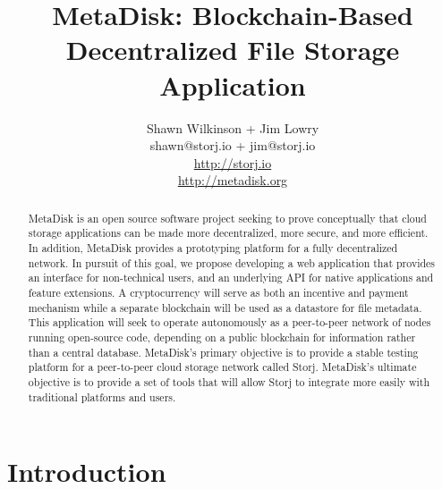 \documentclass[a4paper,10pt]{article}
\begin{document}
\lstset{basicstyle=\ttfamily\footnotesize,breaklines=true}
\lstset{numbers=left, numberstyle=\tiny, stepnumber=1, numbersep=5pt}
\lstset{language=TeX}


\title{\large \bf MetaDisk:  Blockchain-Based Decentralized File Storage Application}
\author{\small Shawn Wilkinson + Jim Lowry\\ \small shawn@storj.io + jim@storj.io \\  \small \url{http://storj.io} \\  \small \url{http://metadisk.org}}
\maketitle


\begin{abstract}
MetaDisk is an open source software project seeking to prove conceptually that cloud storage applications can be made more decentralized, more secure, and more efficient. In addition, MetaDisk provides a prototyping platform for a fully decentralized network. In pursuit of this goal, we propose developing a web application that provides an interface for non-technical users, and an underlying API for native applications and feature extensions. A cryptocurrency will serve as both an incentive and payment mechanism while a separate blockchain will be used as a datastore for file metadata. This application will seek to operate autonomously as a peer-to-peer network of nodes running open-source code, depending on a public blockchain for information rather than a central database. MetaDisk’s primary objective is to provide a stable testing platform for a peer-to-peer cloud storage network called Storj. MetaDisk’s ultimate objective is to provide a set of tools that will allow Storj to integrate more easily with traditional platforms and users. 
\end{abstract}
\section{Introduction}
\end{document}
